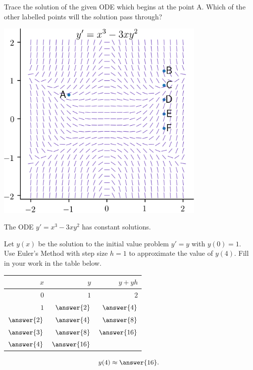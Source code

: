 \documentclass{ximera}
\begin{document}
\begin{exercise}
Trace the solution of the given ODE which begins at the point A. Which of the other labelled points will the solution pass through?
\begin{center}\begin{image}
\includegraphics[width=4in]{images/connect02.png}
\end{image}\end{center}
\begin{multipleChoice}
\end{multipleChoice}
The ODE $y' = x^3 - 3x y^2$ has  constant solutions.
\end{exercise}

\begin{exercise}
Let $y(x)$ be the solution to the initial value problem $y' = y$ with $y(0) = 1$. Use Euler's Method with step size $h = 1$ to approximate the value of $y(4)$. Fill in your work in the table below.
\begin{center}
\begin{tabular}{rrr}
$x$ & $y$  & $y + y h$ \\
\hline
$0$ & $1$  & $2$ \\
$1$ & $\answer{2}$  & $\answer{4}$ \\
$\answer{2}$ & $\answer{4}$  & $\answer{8}$ \\
$\answer{3}$ & $\answer{8}$ &  $\answer{16}$ \\
$\answer{4}$ & $\answer{16}$   &  \\
\end{tabular}
\end{center}
\[ y(4) \approx \answer{16}. \]
\end{exercise}
\end{document}
